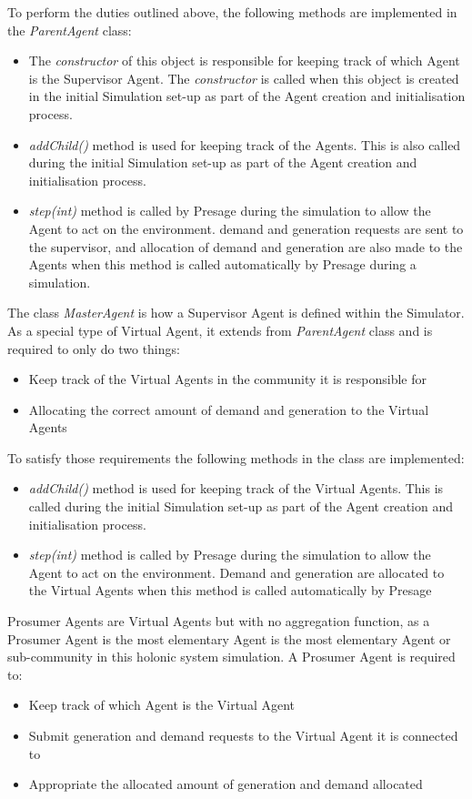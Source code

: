 To perform the duties outlined above, the following methods are implemented in the \textit{ParentAgent} class:
\begin{itemize}
	\item The \textit{constructor} of this object is responsible for keeping track of which Agent is the Supervisor Agent. The \textit{constructor} is called when this object is created in the initial Simulation set-up as part of the Agent creation and initialisation process.
	\item \textit{addChild()} method is used for keeping track of the Agents. This is also called during the initial Simulation set-up as part of the Agent creation and initialisation process.
	\item \textit{step(int)} method is called by Presage during the simulation to allow the Agent to act on the environment. demand and generation requests are sent to the supervisor, and allocation of demand and generation are also made to the Agents when this method is called automatically by Presage during a simulation.
\end{itemize}

The class \textit{MasterAgent} is how a Supervisor Agent is defined within the Simulator. As a special type of Virtual Agent, it extends from \textit{ParentAgent} class and is required to only do two things:
\begin{itemize}
	\item Keep track of the Virtual Agents in the community it is responsible for
	\item Allocating the correct amount of demand and generation to the Virtual Agents
\end{itemize}

To satisfy those requirements the following methods in the class are implemented:
\begin{itemize}
	\item \textit{addChild()} method is used for keeping track of the Virtual Agents. This is called during the initial Simulation set-up as part of the Agent creation and initialisation process.
	\item \textit{step(int)} method is called by Presage during the simulation to allow the Agent to act on the environment. Demand and generation are allocated to the Virtual Agents when this method is called automatically by Presage
\end{itemize}

Prosumer Agents are Virtual Agents but with no aggregation function, as a Prosumer Agent is the most elementary Agent is the most elementary Agent or sub-community in this holonic system simulation. A Prosumer Agent is required to:
\begin{itemize}
	\item Keep track of which Agent is the Virtual Agent
	\item Submit generation and demand requests to the Virtual Agent it is connected to
	\item Appropriate the allocated amount of generation and demand allocated
\end{itemize}

